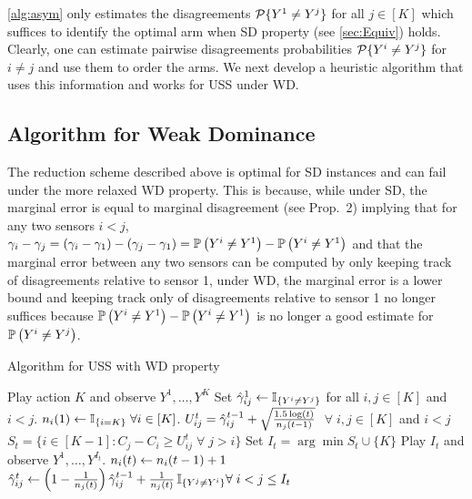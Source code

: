 \cref{alg:asym} only estimates the disagreements $\P\{Y^1 \neq Y^j\}$ for all $j \in [K]$ which suffices to identify the optimal arm when SD property (see \cref{sec:Equiv}) holds. Clearly, one can estimate pairwise disagreements probabilities $\P\{Y^i \neq Y^j\}$ for $i\neq j$ and use them to order the arms. We next develop a heuristic algorithm that uses this information and works for USS under WD. 

\subsection{Algorithm for Weak Dominance}
The reduction scheme described above is optimal for SD instances and can fail under the more relaxed WD property. This is because, while under SD, the marginal error is equal to marginal disagreement (see Prop.~2) implying that for any two sensors $i < j$, $\gamma_i-\gamma_j = (\gamma_i-\gamma_1) - (\gamma_j-\gamma_1) = \Prob{Y^i\ne Y^1} - \Prob{Y^i\ne Y^1}$ and that the marginal error between any two sensors can be computed by only keeping track of disagreements relative to sensor 1, 
under WD, the marginal error is a lower bound and keeping track only of disagreements relative to sensor 1 no longer suffices because $\Prob{Y^i\ne Y^1} - \Prob{Y^i\ne Y^1}$ is no longer a good estimate for $\Prob{Y^i\ne Y^j}$.
		\begin{algorithm}[t]
			\caption{Algorithm for USS with WD property} %
			\label{alg:UCB}
			\begin{algorithmic}[1]
				\STATE Play action $K$ and observe $Y^1,\dots,Y^K$
				\STATE Set $\hgamma_{ij}^1 \set \one{Y^i\ne Y^j}$ for all $i,j\in [K]$ and $i < j$.
				\STATE $n_i(1)\leftarrow \one{i=K} \; \forall i\in [K]$.
				\STATE $U_{ij}^t=\hgamma_{ij}^{t-1} + \sqrt{\frac{1.5\log(t)}{n_j(t-1)}}$  $\;\forall \; i,j \in [K]$ and $i<j$ \label{algo:UCB}
				\STATE $S_t=\{i \in [K-1]: C_j-C_i \geq U_{ij}^t \;\forall \;   j > i \}$ \label{algo:sort}
				\STATE Set $I_t= \arg \min S_t \cup \{K\} $
				\STATE Play $I_t$ and observe $Y^1,\dots,Y^{I_t}$.
				\STATE $n_i(t) \set n_i(t-1)+1$\\
				 \STATE $\hgamma_{ij}^t \set \left (1-\frac{1}{n_j(t)}\right )
				 \hgamma_{ij}^{t-1} + \frac{1}{n_j(t)} \,\one{Y^j\ne Y^i} \forall \; i<j \leq I_t$ \label{algo:Update}
				\ENDFOR
				\ENDFOR
			\end{algorithmic}
		\end{algorithm}

